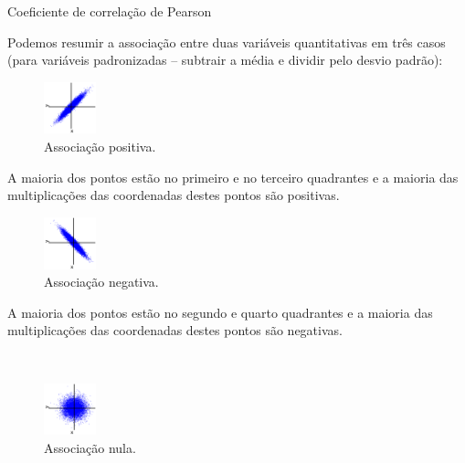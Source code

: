 \documentclass[9pt]{beamer}
\begin{document}
\begin{frame}{Coeficiente de correlação de Pearson}

\footnotesize
	Podemos resumir a associação entre duas variáveis quantitativas em três casos (para variáveis padronizadas -- subtrair a média e dividir pelo desvio padrão):
	
	
	\begin{minipage}[b]{0.24\linewidth}
		\begin{figure}[htbp]
			\centering
			\caption{\footnotesize  Associação positiva.}
			\includegraphics[width= 1.5cm]{figures/a_positiva.png}
		\end{figure}
	\end{minipage}%
	\begin{minipage}[b]{0.24\linewidth}
		\begin{center}
				A maioria dos pontos estão no primeiro e no terceiro quadrantes e a maioria das multiplicações das coordenadas destes pontos são positivas.
		\end{center}
	\end{minipage}	
	\begin{minipage}[b]{0.24\linewidth}
		\begin{figure}[htbp]
			\centering
			\caption{\footnotesize  Associação negativa.}
			\includegraphics[width= 1.5cm]{figures/a_negativa.png}
		\end{figure}
	\end{minipage}%
	\begin{minipage}[b]{0.24\linewidth}
		\begin{center}
				A maioria dos pontos estão no segundo e quarto quadrantes e a maioria das multiplicações das coordenadas destes pontos são negativas.
		\end{center}
	\end{minipage} \\
	\begin{center}
		\begin{minipage}[b]{0.35\linewidth}
			\begin{figure}[htbp]
				\centering
				\caption{\footnotesize Associação nula.}
				\includegraphics[width= 1.5cm]{figures/a_nula.png}

\end{figure}
\end{minipage}
\end{center}
\end{frame}
\end{document}
